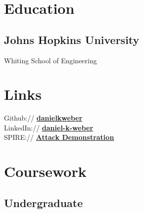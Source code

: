 \documentclass[]{deedy-resume-openfont}
\begin{document}
\hfill
\begin{minipage}[t]{0.33\textwidth} 




\section{Education} 

\subsection{Johns Hopkins University}

Whiting School of Engineering

\sectionsep



\section{Links} 
Github:// \href{https://github.com/Danielkweber}{\bf danielkweber} \\
LinkedIn://  \href{https://www.linkedin.com/in/daniel-k-weber/}{\bf daniel-k-weber} \\
SPIRE:// \href{http://www.dsn.jhu.edu/courses/cs310/power-grid/}{\bf Attack Demonstration}
\sectionsep


\section{Coursework}

\subsection{Undergraduate}
 \\
 \\
 \\
 \\
 \\
 \\
 \\
 \\
\sectionsep


\end{minipage}
\end{document}
